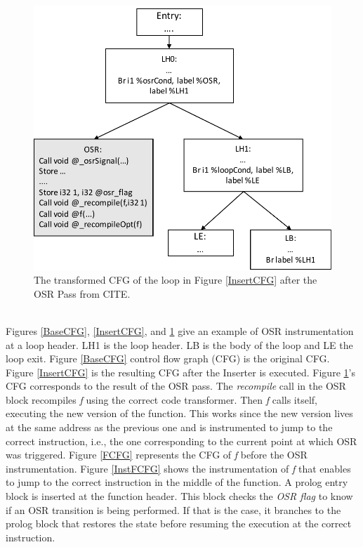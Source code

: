 \begin{figure}[h]
\centering
\includegraphics[scale=0.5]{Figures/OSRPassCFG}
\decoRule
\caption[The transformed CFG of the loop in Figure \ref{InsertCFG} after the OSR Pass]{The transformed CFG of the loop in Figure \ref{InsertCFG} after the OSR Pass from CITE.}
\label{OSRPassCFG}
\end{figure}\\

Figures \ref{BaseCFG}, \ref{InsertCFG}, and \ref{OSRPassCFG} give an example of OSR instrumentation at a loop header.
LH1 is the loop header. 
LB is the body of the loop and LE the loop exit. 
Figure \ref{BaseCFG} control flow graph (CFG) is the original CFG. 
Figure \ref{InsertCFG} is the resulting CFG after the Inserter is executed.
Figure \ref{OSRPassCFG}'s CFG corresponds to the result of the OSR pass.
The \textit{recompile} call in the OSR block recompiles \textit{f} using the correct code transformer.
Then \textit{f} calls itself, executing the new version of the function.
This works since the new version lives at the same address as the previous one and is instrumented to jump to the correct instruction, i.e., the one corresponding to the current point at which OSR was triggered.
Figure \ref{FCFG} represents the CFG of \textit{f} before the OSR instrumentation.
Figure \ref{InstFCFG} shows the instrumentation of \textit{f} that enables to jump to the correct instruction in the middle of the function. 
A prolog entry block is inserted at the function header.
This block checks the \textit{OSR flag} to know if an OSR transition is being performed.
If that is the case, it branches to the prolog block that restores the state before resuming the execution at the correct instruction.\\

